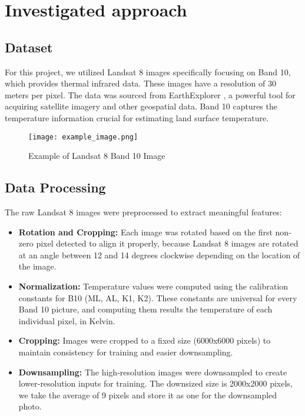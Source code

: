 \documentclass[runningheads,a4paper,11pt]{report}
\begin{document}
\chapter{Investigated approach}
\label{chapter:proposedApproach}

\section{Dataset}

    For this project, we utilized Landsat 8 images specifically focusing on Band 10, which provides thermal infrared data. These images have a resolution of 30 meters per pixel. The data was sourced from EarthExplorer \cite{usgs}, a powerful tool for acquiring satellite imagery and other geospatial data. Band 10 captures the temperature information crucial for estimating land surface temperature.

\begin{figure}[H]
    \centering 
    \texttt{[image: example\_image.png]}
    \caption{Example of Landsat 8 Band 10 Image}
    \label{fig:exampleImage}
\end{figure}

\section{Data Processing} The raw Landsat 8 images were preprocessed to extract meaningful features: \begin{itemize}
    \item \textbf{Rotation and Cropping:} Each image was rotated based on the first non-zero pixel detected to align it properly, because Landsat 8 images are rotated at an angle between 12 and 14 degrees clockwise depending on the location of the image.
    \item \textbf{Normalization:} Temperature values were computed using the calibration constants for B10 (ML, AL, K1, K2). These constants are universal for every Band 10 picture, and computing them results the temperature of each individual pixel, in Kelvin.
    \item \textbf{Cropping:} Images were cropped to a fixed size (6000x6000 pixels) to maintain consistency for training and easier downsampling.
    \item \textbf{Downsampling:} The high-resolution images were downsampled to create lower-resolution inputs for training. The downsized size is 2000x2000 pixels, we take the average of 9 pixels and store it as one for the downsampled photo.
\end{itemize}
\end{document}
